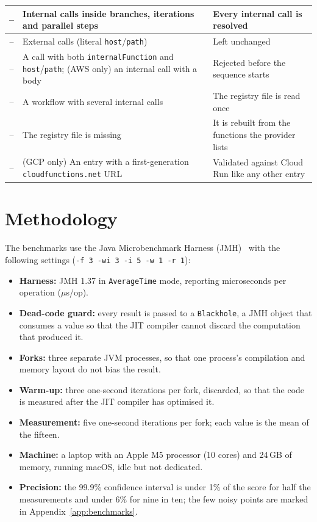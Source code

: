 \begin{table}[!htbp]
\begin{tabular}{|c|>{\raggedright\arraybackslash}p{}|>{\raggedright\arraybackslash}p{}|}
    \hline
    -- & Internal calls inside branches, iterations and parallel steps & Every internal call is
    resolved \\
    \hline
    -- & External calls (literal \texttt{host}/\texttt{path}) & Left unchanged \\
    \hline
    -- & A call with both \texttt{internalFunction} and \texttt{host}/\texttt{path}; (AWS only) an
    internal call with a body & Rejected before the sequence starts \\
    \hline
    -- & A workflow with several internal calls & The registry file is read once \\
    \hline
    -- & The registry file is missing & It is rebuilt from the functions the provider lists \\
    \hline
    -- & (GCP only) An entry with a first-generation \texttt{cloudfunctions.net} URL & Validated
    against Cloud Run like any other entry \\
    \hline
  \end{tabular}
\end{table}

\section{Methodology}
\label{sec:eval-methodology}

The benchmarks use the Java Microbenchmark Harness (JMH)~\cite{jmh} with the following settings
(\texttt{-f 3 -wi 3 -i 5 -w 1 -r 1}):

\begin{itemize}
  \item \textbf{Harness:} JMH 1.37 in \texttt{Average\allowbreak Time} mode, reporting
  microseconds per operation ($\mu$s/op).
  \item \textbf{Dead-code guard:} every result is passed to a \texttt{Blackhole}, a JMH object that
  consumes a value so that the JIT compiler cannot discard the computation that produced it.
  \item \textbf{Forks:} three separate JVM processes, so that one process's compilation and memory
  layout do not bias the result.
  \item \textbf{Warm-up:} three one-second iterations per fork, discarded, so that the code is
  measured after the JIT compiler has optimised it.
  \item \textbf{Measurement:} five one-second iterations per fork; each value is the mean of the
  fifteen.
  \item \textbf{Machine:} a laptop with an Apple M5 processor (10 cores) and 24\,GB of memory,
  running macOS, idle but not dedicated.
  \item \textbf{Precision:} the 99.9\% confidence interval is under 1\% of the score for half the
  measurements and under 6\% for nine in ten; the few noisy points are marked in
  Appendix~\ref{app:benchmarks}.
\end{itemize}


